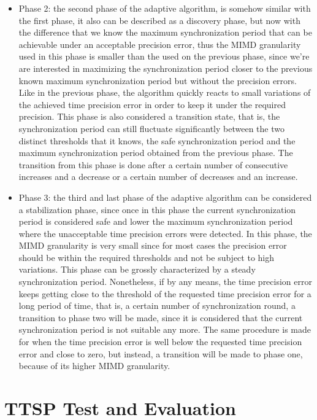 \documentclass[11pt,a4]{article}
\begin{document}
\begin{multicols}{2}
\begin{itemize}
\item Phase 2: the second phase of the adaptive algorithm, is somehow similar with the first phase, it also can be described as a discovery phase, but now with the difference that we know the maximum synchronization period that can be achievable under an acceptable precision error, thus the MIMD granularity used in this phase is smaller than the used on the previous phase, since we're are interested in maximizing the synchronization period closer to the previous known maximum synchronization period but without the precision errors. Like in the previous phase, the algorithm quickly reacts to small variations of the achieved time precision error in order to keep it under the required precision. This phase is also considered a transition state, that is, the synchronization period can still fluctuate significantly between the two distinct thresholds that it knows, the safe synchronization period and the maximum synchronization period obtained from the previous phase. The transition from this phase is done after a certain number of consecutive increases and a decrease or a certain number of decreases and an increase.

\item Phase 3: the third and last phase of the adaptive algorithm can be considered a stabilization phase, since once in this phase the current synchronization period is considered safe and lower the maximum synchronization period where the unacceptable time precision errors were detected. In this phase, the MIMD granularity is very small since for most cases the precision error should be within the required thresholds and not be subject to high variations. This phase can be grossly characterized by a steady synchronization period. Nonetheless, if by any means, the time precision error keeps getting close to the threshold of the requested time precision error for a long period of time, that is, a certain number of synchronization round, a transition to phase two will be made, since it is considered that the current synchronization period is not suitable any more. The same procedure is made for when the time precision error is well below the requested time precision error and close to zero, but instead, a transition will be made to phase one, because of its higher MIMD granularity.
\end{itemize}

\section{TTSP Test and Evaluation}


\end{multicols}
\end{document}
